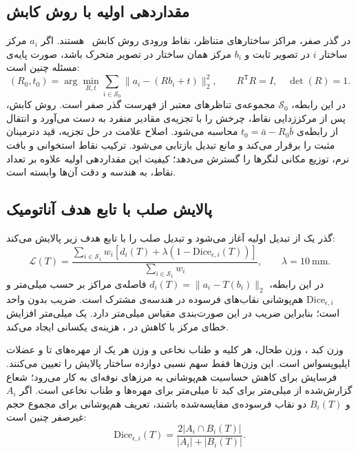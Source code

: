 \subsection{مقداردهی اولیه با روش کابش}
\label{sec:m-reg-rigid}

در گذر صفر، مراکز ساختارهای متناظر، نقاط ورودی روش کابش~\cite{kabsch1976} هستند. اگر $a_i$ مرکز ساختار $i$ در تصویر ثابت و $b_i$ مرکز همان ساختار در تصویر متحرک باشد، صورت پایه‌ی مسئله چنین است:
\begin{equation}
(R_0,t_0)=\arg\min_{R,t}\sum_{i\in\mathcal S_0}\|a_i-(Rb_i+t)\|_2^2,
\qquad R^{\mathsf T}R=I,\quad\det(R)=1.
\label{eq:m-kabsch}
\end{equation}
در این رابطه، $\mathcal S_0$ مجموعه‌ی تناظرهای معتبر از فهرست گذر صفر است. روش کابش، پس از مرکززدایی نقاط، چرخش را با تجزیه‌ی مقادیر منفرد به دست می‌آورد و انتقال از رابطه‌ی $t_0=\bar a-R_0\bar b$ محاسبه می‌شود. اصلاح علامت در حل تجزیه، قید دترمینان مثبت را برقرار می‌کند و مانع تبدیل بازتابی می‌شود. ترکیب نقاط استخوانی و بافت نرم، توزیع مکانی لنگرها را گسترش می‌دهد؛ کیفیت این مقداردهی اولیه علاوه بر تعداد نقاط، به هندسه و دقت آن‌ها وابسته است.

\subsection{پالایش صلب با تابع هدف آناتومیک}

گذر یک از تبدیل اولیه آغاز می‌شود و تبدیل صلب را با تابع هدف زیر پالایش می‌کند:
\begin{equation}
\mathcal L(T)=\frac{\sum_{i\in\mathcal S_1}w_i\left[d_i(T)+\lambda\left(1-\mathrm{Dice}_{\epsilon,i}(T)\right)\right]}{\sum_{i\in\mathcal S_1}w_i},
\qquad \lambda=10\ \mathrm{mm}.
\label{eq:pass1-loss}
\end{equation}
در این رابطه، $d_i(T)=\|a_i-T(b_i)\|_2$ فاصله‌ی مراکز بر حسب میلی‌متر و $\mathrm{Dice}_{\epsilon,i}$ هم‌پوشانی نقاب‌های فرسوده در هندسه‌ی مشترک است. ضریب  بدون واحد است؛ بنابراین ضریب  در این صورت‌بندی مقیاس میلی‌متر دارد. یک میلی‌متر افزایش خطای مرکز با کاهش  در ، هزینه‌ی یکسانی ایجاد می‌کند.

وزن کبد ، وزن طحال، هر کلیه و طناب نخاعی  و وزن هر یک از مهره‌های  تا  و عضلات ایلیوپسواس  است. این وزن‌ها فقط سهم نسبی دوازده ساختار پالایش را تعیین می‌کنند. فرسایش برای کاهش حساسیت هم‌پوشانی به مرزهای نوفه‌ای به کار می‌رود؛ شعاع گزارش‌شده از  میلی‌متر برای کبد تا  میلی‌متر برای مهره‌ها و طناب نخاعی است. اگر $A_i$ و $B_i(T)$ دو نقاب فرسوده‌ی مقایسه‌شده باشند، تعریف هم‌پوشانی برای مجموع حجم غیرصفر چنین است:
\begin{equation}
\mathrm{Dice}_{\epsilon,i}(T)=\frac{2|A_i\cap B_i(T)|}{|A_i|+|B_i(T)|}.
\label{eq:m-eroded-dice}
\end{equation}

